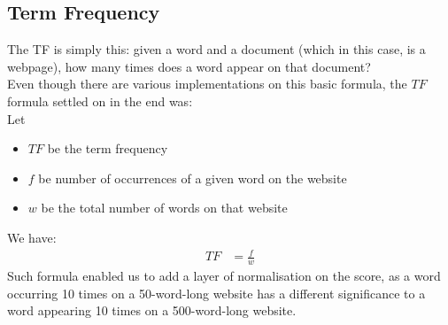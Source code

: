 \subsection{Term Frequency}
The TF is simply this: given a word and a document (which in this case, is a webpage), how many times does a word appear on that document? \citep{luhn1957statistical}\\
Even though there are various implementations on this basic formula, the $TF$ formula settled on in the end was:\\
Let
\begin{itemize}
    \item $TF$ be the term frequency
    \item $f$ be number of occurrences of a given word on the website
    \item $w$ be the total number of words on that website
\end{itemize}
We have:
\begin{align}
    TF &= \frac{f}{w}
    \label{eq:TF}
\end{align}
Such formula enabled us to add a layer of normalisation on the score, as a word occurring 10 times on a 50-word-long website has a different significance to a word appearing 10 times on a 500-word-long website.

